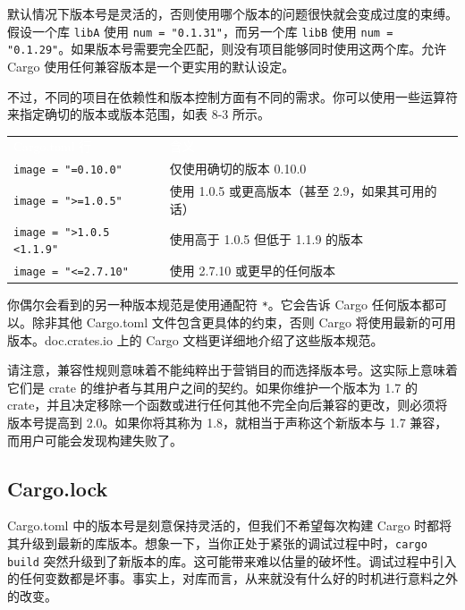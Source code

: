默认情况下版本号是灵活的，否则使用哪个版本的问题很快就会变成过度的束缚。假设一个库 \texttt{libA} 使用 \texttt{num = "0.1.31"}，而另一个库 \texttt{libB} 使用 \texttt{num = "0.1.29"}。如果版本号需要完全匹配，则没有项目能够同时使用这两个库。允许 Cargo 使用任何兼容版本是一个更实用的默认设定。

不过，不同的项目在依赖性和版本控制方面有不同的需求。你可以使用一些运算符来指定确切的版本或版本范围，如表 8-3 所示。


\myTableBegin
\begin{tabularx}{\textwidth}{@{}>{\hsize=1.019\hsize\raggedright\arraybackslash}X>{\hsize=0.981\hsize\raggedright\arraybackslash}X@{}}
\rowcolor{tabhead}\textcolor{white}{Cargo.toml 行} & \textcolor{white}{含义} \\
\texttt{image = "=0.10.0"} & 仅使用确切的版本 0.10.0 \\
\texttt{image = ">=1.0.5"} & 使用 1.0.5 或更高版本（甚至 2.9，如果其可用的话） \\
\texttt{image = ">1.0.5 <1.1.9"} & 使用高于 1.0.5 但低于 1.1.9 的版本 \\
\texttt{image = "<=2.7.10"} & 使用 2.7.10 或更早的任何版本 \\
\end{tabularx}
\myTableEnd

你偶尔会看到的另一种版本规范是使用通配符 \texttt{*}。它会告诉 Cargo 任何版本都可以。除非其他 Cargo.toml 文件包含更具体的约束，否则 Cargo 将使用最新的可用版本。doc.crates.io 上的 Cargo 文档更详细地介绍了这些版本规范。

请注意，兼容性规则意味着不能纯粹出于营销目的而选择版本号。这实际上意味着它们是 crate 的维护者与其用户之间的契约。如果你维护一个版本为 1.7 的 crate，并且决定移除一个函数或进行任何其他不完全向后兼容的更改，则必须将版本号提高到 2.0。如果你将其称为 1.8，就相当于声称这个新版本与 1.7 兼容，而用户可能会发现构建失败了。

\subsection{Cargo.lock}

Cargo.toml 中的版本号是刻意保持灵活的，但我们不希望每次构建 Cargo 时都将其升级到最新的库版本。想象一下，当你正处于紧张的调试过程中时，\texttt{cargo build} 突然升级到了新版本的库。这可能带来难以估量的破坏性。调试过程中引入的任何变数都是坏事。事实上，对库而言，从来就没有什么好的时机进行意料之外的改变。

